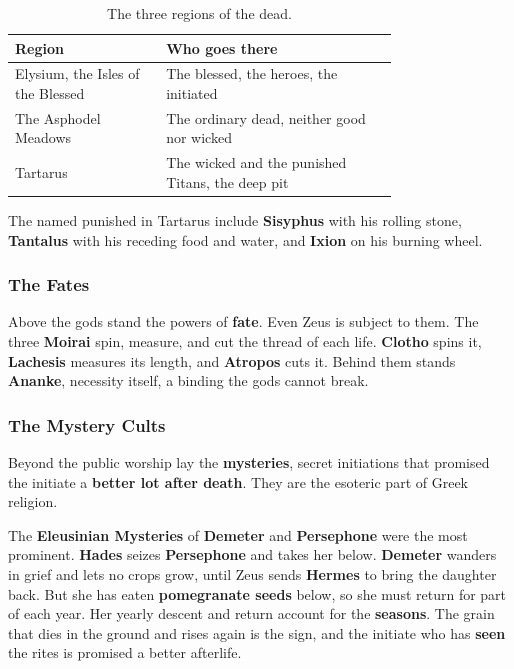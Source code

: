 \begin{longtable}{L{0.30\linewidth} L{0.46\linewidth}}
\caption{The three regions of the dead.}\\
\toprule
\textbf{Region} & \textbf{Who goes there} \\
\midrule
Elysium, the Isles of the Blessed & The blessed, the heroes, the initiated \\
The Asphodel Meadows & The ordinary dead, neither good nor wicked \\
Tartarus & The wicked and the punished Titans, the deep pit \\
\bottomrule
\end{longtable}

The named punished in Tartarus include \textbf{Sisyphus} with his rolling stone,
\textbf{Tantalus} with his receding food and water, and \textbf{Ixion} on his
burning wheel.

\subsubsection{The Fates}

Above the gods stand the powers of \textbf{fate}. Even Zeus is subject to them.
The three \textbf{Moirai} spin, measure, and cut the thread of each life.
\textbf{Clotho} spins it, \textbf{Lachesis} measures its length, and
\textbf{Atropos} cuts it. Behind them stands \textbf{Ananke}, necessity itself, a
binding the gods cannot break.

\subsubsection{The Mystery Cults}

Beyond the public worship lay the \textbf{mysteries}, secret initiations that
promised the initiate a \textbf{better lot after death}. They are the esoteric
part of Greek religion.

The \textbf{Eleusinian Mysteries} of \textbf{Demeter} and \textbf{Persephone}
were the most prominent. \textbf{Hades} seizes \textbf{Persephone} and takes her
below. \textbf{Demeter} wanders in grief and lets no crops grow, until Zeus sends
\textbf{Hermes} to bring the daughter back. But she has eaten \textbf{pomegranate
seeds} below, so she must return for part of each year. Her yearly descent and
return account for the \textbf{seasons}. The grain that dies in the ground and
rises again is the sign, and the initiate who has \textbf{seen} the rites is
promised a better afterlife.

